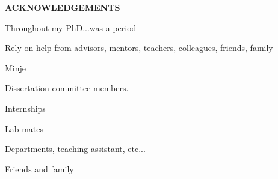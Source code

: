 \begin{centering}
\textbf{ACKNOWLEDGEMENTS}\\
\vspace{\baselineskip}
\end{centering}

Throughout my PhD...was a period

Rely on help from advisors, mentors, teachers, colleagues, friends, family

Minje

Dissertation committee members. 

Internships

Lab mates

Departments, teaching assistant, etc...

Friends and family
